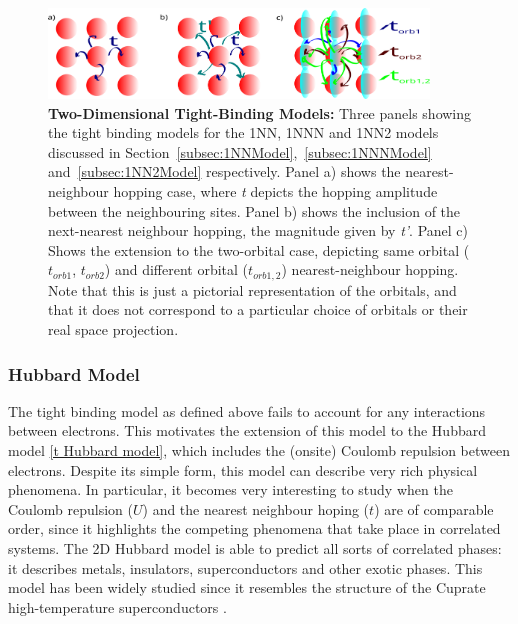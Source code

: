 \documentclass[12pt]{article}
\begin{document}
\begin{figure}[htbp]  %
    \centering
    \includegraphics[width=0.9\textwidth]{2Dhubbardmodel.png}  %
    \caption{\textbf{Two-Dimensional Tight-Binding Models:} Three panels showing the tight binding models for the 1NN, 1NNN and 1NN2 models discussed in Section~\ref{subsec:1NNModel},~\ref{subsec:1NNNModel} and~\ref{subsec:1NN2Model} respectively. Panel a) shows the nearest-neighbour hopping case, where \textit{t} depicts the hopping amplitude between the neighbouring sites. Panel b) shows the inclusion of the next-nearest neighbour hopping, the magnitude given by \textit{t'}.
    Panel c) Shows the extension to the two-orbital case, depicting  same orbital ($t_{orb1}$, $t_{orb2}$) and different orbital ($t_{orb1,2}$) nearest-neighbour hopping. Note that this is just a pictorial representation of the orbitals, and that it does not correspond to a particular choice of orbitals or their real space projection. }
    \label{fig:2D Hubbard model}
\end{figure}

\newpage

\subsubsection{Hubbard Model}
\label{subsec: HubbardModel}

The  tight binding model as defined above fails to account for any interactions between electrons. This motivates the extension of this model to the Hubbard model \eqref{t Hubbard model}, which includes the (onsite) Coulomb repulsion between electrons. Despite its simple form, this model can describe very rich physical phenomena.
In particular, it becomes very interesting to study when the Coulomb repulsion ($U$) and the nearest neighbour hoping ($t$) are of comparable order, since it highlights the competing phenomena that take place in correlated systems. 
The 2D Hubbard model is able to predict all sorts of correlated phases: it describes metals, insulators, superconductors and other exotic phases\cite{white1989numerical,hirsch1985two, anderson1990luttinger,sun2011nearly}. 
This model has been widely studied since it resembles the structure of the Cuprate high-temperature superconductors \cite{dagotto1994correlated}. 
\end{document}
